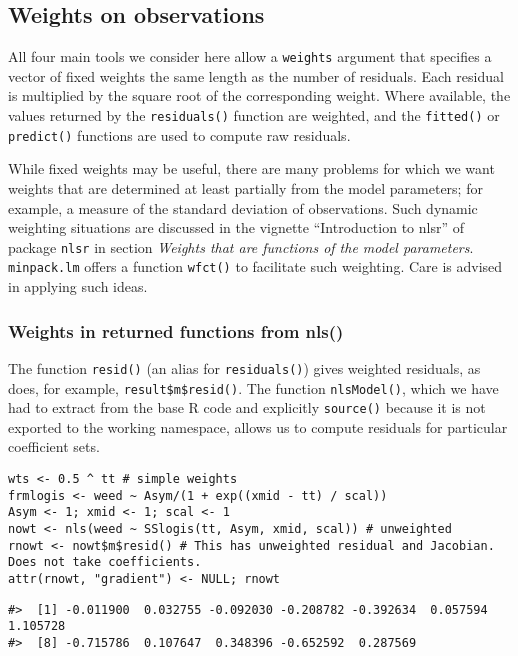 \hypertarget{weights-on-observations}{%
\subsection{Weights on observations}\label{weights-on-observations}}

All four main tools we consider here allow a \texttt{weights} argument that
specifies a vector of fixed weights the same length as the number of residuals.
Each residual is multiplied by the square root of the corresponding weight.
Where available, the values returned by the
\texttt{residuals()} function are weighted, and the \texttt{fitted()} or \texttt{predict()} functions are
used to compute raw residuals.

While fixed weights may be useful, there are many problems for which
we want weights that are determined at least partially from the model
parameters; for
example, a measure of the standard deviation of observations.
Such dynamic weighting situations are discussed in the vignette
``Introduction to nlsr'' of package \texttt{nlsr} in section
\emph{Weights that are functions of the model parameters}.
\texttt{minpack.lm} offers a function \texttt{wfct()} to
facilitate such weighting. Care is advised
in applying such ideas.

\hypertarget{weights-in-returned-functions-from-nls}{%
\subsubsection{Weights in returned functions from nls()}\label{weights-in-returned-functions-from-nls}}

The function \texttt{resid()} (an alias for \texttt{residuals()}) gives weighted residuals,
as does, for example, \texttt{result\$m\$resid()}. The function \texttt{nlsModel()}, which we
have had to extract from the base R code and explicitly \texttt{source()} because it
is not exported to the working namespace,
allows us to compute residuals for particular coefficient sets.

\begin{verbatim}
wts <- 0.5 ^ tt # simple weights
frmlogis <- weed ~ Asym/(1 + exp((xmid - tt) / scal))
Asym <- 1; xmid <- 1; scal <- 1
nowt <- nls(weed ~ SSlogis(tt, Asym, xmid, scal)) # unweighted
rnowt <- nowt$m$resid() # This has unweighted residual and Jacobian. Does not take coefficients.
attr(rnowt, "gradient") <- NULL; rnowt
\end{verbatim}

\begin{verbatim}
#>  [1] -0.011900  0.032755 -0.092030 -0.208782 -0.392634  0.057594  1.105728
#>  [8] -0.715786  0.107647  0.348396 -0.652592  0.287569
\end{verbatim}

